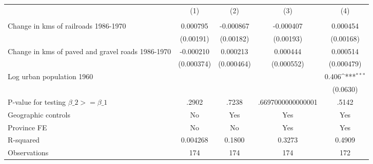 {
\def\sym#1{\ifmmode^{#1}\else\(^{#1}\)\fi}
\begin{tabular}{l*{4}{c}}
\hline\hline
                &\multicolumn{1}{c}{(1)}&\multicolumn{1}{c}{(2)}&\multicolumn{1}{c}{(3)}&\multicolumn{1}{c}{(4)}\\
                &\multicolumn{1}{c}{}&\multicolumn{1}{c}{}&\multicolumn{1}{c}{}&\multicolumn{1}{c}{}\\
\hline
Change in kms of railroads 1986-1970& 0.000795         &-0.000867         &-0.000407         & 0.000454         \\
                &(0.00191)         &(0.00182)         &(0.00193)         &(0.00168)         \\
[1em]
Change in kms of paved and gravel roads 1986-1970&-0.000210         & 0.000213         & 0.000444         & 0.000514         \\
                &(0.000374)         &(0.000464)         &(0.000552)         &(0.000479)         \\
[1em]
Log urban population 1960&                  &                  &                  &    0.406\sym{***}\\
                &                  &                  &                  & (0.0630)         \\
\hline
P-value for testing $\beta\_{2} >= \beta\_{1}$&    .2902         &    .7238         &.6697000000000001         &    .5142         \\
Geographic controls&       No         &      Yes         &      Yes         &      Yes         \\
Province FE     &       No         &       No         &      Yes         &      Yes         \\
R-squared       & 0.004268         &   0.1800         &   0.3273         &   0.4909         \\
Observations    &      174         &      174         &      174         &      172         \\
\hline\hline
\end{tabular}
}

